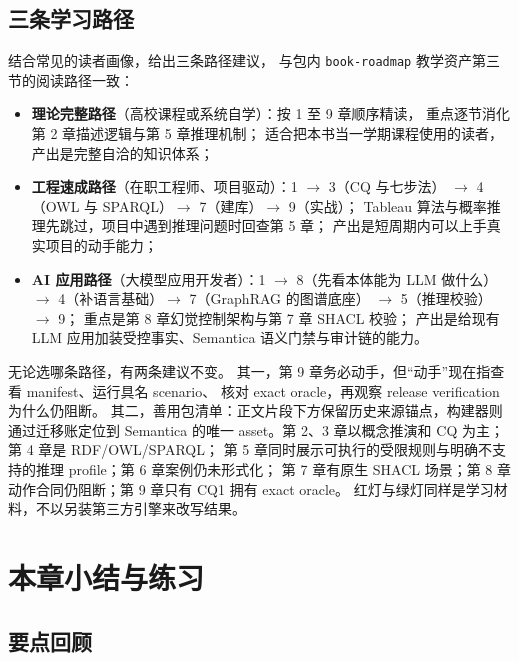 \subsection{三条学习路径}

结合常见的读者画像，给出三条路径建议，
与包内 \texttt{book-roadmap} 教学资产第三节的阅读路径一致：

\begin{itemize}
\item \textbf{理论完整路径}（高校课程或系统自学）：按 1 至 9 章顺序精读，
      重点逐节消化第 2 章描述逻辑与第 5 章推理机制；
      适合把本书当一学期课程使用的读者，产出是完整自洽的知识体系；
\item \textbf{工程速成路径}（在职工程师、项目驱动）：1 \(\rightarrow\) 3（CQ 与七步法）
      \(\rightarrow\) 4（OWL 与 SPARQL）\(\rightarrow\) 7（建库）\(\rightarrow\) 9（实战）；
      Tableau 算法与概率推理先跳过，项目中遇到推理问题时回查第 5 章；
      产出是短周期内可以上手真实项目的动手能力；
\item \textbf{AI 应用路径}（大模型应用开发者）：1 \(\rightarrow\) 8（先看本体能为 LLM 做什么）
      \(\rightarrow\) 4（补语言基础）\(\rightarrow\) 7（GraphRAG 的图谱底座）
      \(\rightarrow\) 5（推理校验）\(\rightarrow\) 9；
      重点是第 8 章幻觉控制架构与第 7 章 SHACL 校验；
      产出是给现有 LLM 应用加装受控事实、Semantica 语义门禁与审计链的能力。
\end{itemize}

无论选哪条路径，有两条建议不变。
其一，第 9 章务必动手，但“动手”现在指查看 manifest、运行具名 scenario、
核对 exact oracle，再观察 release verification 为什么仍阻断。
其二，善用包清单：正文片段下方保留历史来源锚点，构建器则通过迁移账定位到
Semantica 的唯一 asset。第 2、3 章以概念推演和 CQ 为主；第 4 章是 RDF/OWL/SPARQL；
第 5 章同时展示可执行的受限规则与明确不支持的推理 profile；第 6 章案例仍未形式化；
第 7 章有原生 SHACL 场景；第 8 章动作合同仍阻断；第 9 章只有 CQ1 拥有 exact oracle。
红灯与绿灯同样是学习材料，不以另装第三方引擎来改写结果。

\section{本章小结与练习}

\subsection{要点回顾}

